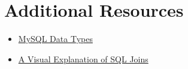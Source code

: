 \section{Additional Resources}

\begin{itemize}[leftmargin=*]
    \item \href{https://dev.mysql.com/doc/refman/5.7/en/data-types.html}{MySQL Data Types}
    \item \href{https://blog.codinghorror.com/a-visual-explanation-of-sql-joins/}{A Visual Explanation of SQL Joins}
\end{itemize}

